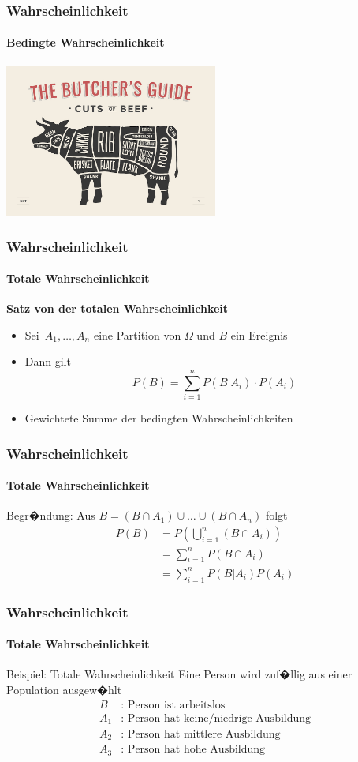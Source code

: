\documentclass[12pt,show notes]{beamer}
\begin{document}
\begin{frame}
\frametitle{Wahrscheinlichkeit}
\framesubtitle{Bedingte Wahrscheinlichkeit}
\begin{center}
\includegraphics[width=7cm]{../book/images/AdobeStock_101998556b_ButcherGuide.jpeg}
\end{center}
\end{frame}

\begin{frame}
\frametitle{Wahrscheinlichkeit}
\framesubtitle{Totale Wahrscheinlichkeit}
\textbf{Satz von der totalen Wahrscheinlichkeit}\medskip
\begin{itemize}
\item Sei\ $A_1,\ldots ,A_n$ eine Partition von $\Omega$
und $B$ ein Ereignis
\item Dann gilt
\[ P(B) = \sum_{i=1}^{n}P(B|A_i)\cdot P(A_i) \]
\item Gewichtete Summe der bedingten Wahrscheinlichkeiten
\end{itemize}
\end{frame}

\begin{frame}
\frametitle{Wahrscheinlichkeit}
\framesubtitle{Totale Wahrscheinlichkeit}
Begr�ndung: Aus $B=(B\cap A_1)\cup\ldots\cup (B\cap A_n)$ folgt
\begin{align*}
P(B) &= P\left(\bigcup_{i=1}^n (B\cap A_i)\right) \\
&= \sum_{i=1}^n P(B\cap A_i)\\
&= \sum_{i=1}^n P(B|A_i)P(A_i)
\end{align*}
\end{frame}

\begin{frame}
\frametitle{Wahrscheinlichkeit}
\framesubtitle{Totale Wahrscheinlichkeit}
\begin{exampleblock}{Beispiel: Totale Wahrscheinlichkeit}
Eine Person wird zuf�llig aus einer Population ausgew�hlt
\begin{align*}
B &\text{: Person ist arbeitslos } \\
A_{1} &\text{: Person hat keine/niedrige Ausbildung} \\
A_{2} &\text{: Person hat mittlere Ausbildung} \\
A_{3} &\text{: Person hat hohe Ausbildung}
\end{align*}
\end{exampleblock}
\end{frame}
\end{document}
